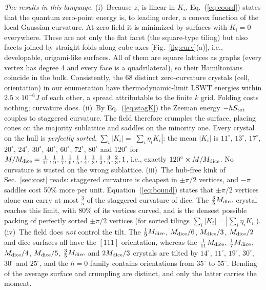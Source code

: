 \documentclass[prb,twocolumn,amsmath,amssymb,floatfix]{revtex4-2}
\newcommand{\Md}{M_{\rm dice}}
\begin{document}
\emph{The results in this language.} (i)~Because $z_i$ is linear in $K_i$, Eq.~(\ref{eq:coord}) states that the quantum zero-point energy is, to leading order, a convex function of the local Gaussian curvature. At zero field it is minimized by surfaces with $K_i=0$ everywhere. These are not only the flat facet (the square-type tiling) but also facets joined by straight folds along cube axes [Fig.~\ref{fig:curv}(a)], i.e., developable, origami-like surfaces. All of them are square lattices as graphs (every vertex has degree 4 and every face is a quadrilateral), so their Hamiltonians coincide in the bulk. Consistently, the 68 distinct zero-curvature crystals (cell, orientation) in our enumeration have thermodynamic-limit LSWT energies within $2.5\times10^{-6}J$ of each other, a spread attributable to the finite $k$ grid. Folding costs nothing; curvature does. (ii)~By Eq.~(\ref{eq:stagK}) the Zeeman energy $-hS_{\rm tot}$ couples to staggered curvature. The field therefore crumples the surface, placing cones on the majority sublattice and saddles on the minority one. Every crystal on the hull is \emph{perfectly sorted}, $\sum_i|K_i|=|\sum_i\eta_iK_i|$: the mean $|K_i|$ is $11^\circ$, $13^\circ$, $17^\circ$, $20^\circ$, $24^\circ$, $30^\circ$, $40^\circ$, $60^\circ$, $72^\circ$, $80^\circ$ and $120^\circ$ for $M/\Md=\frac1{11},\frac19,\frac17,\frac16,\frac15,\frac14,\frac13,\frac12,\frac35,\frac23,1$, i.e., exactly $120^\circ\times M/\Md$. No curvature is wasted on the wrong sublattice. (iii)~The hub-free kink of Sec.~\ref{sec:cost} reads: staggered curvature is cheapest in $\pm\pi/2$ vertices, and $-\pi$ saddles cost 50\% more per unit. Equation~(\ref{eq:bound}) states that $\pm\pi/2$ vertices alone can carry at most $\frac35$ of the staggered curvature of dice. The $\frac35\Md$ crystal reaches this limit, with 80\% of its vertices curved, and is the densest possible packing of perfectly sorted $\pm\pi/2$ vertices (for sorted tilings $\sum_i|K_i|=|\sum_i\eta_iK_i|$). (iv)~The field does \emph{not} control the tilt. The $\frac19\Md$, $\Md/6$, $\Md/3$, $\Md/2$ and dice surfaces all have the $[111]$ orientation, whereas the $\frac1{11}\Md$, $\frac17\Md$, $\Md/4$, $\Md/5$, $\frac35\Md$ and $2\Md/3$ crystals are tilted by $14^\circ$, $11^\circ$, $19^\circ$, $30^\circ$, $30^\circ$ and $25^\circ$, and the $h=0$ family contains orientations from $35^\circ$ to $55^\circ$. Bending of the average surface and crumpling are distinct, and only the latter carries the moment.
\end{document}
